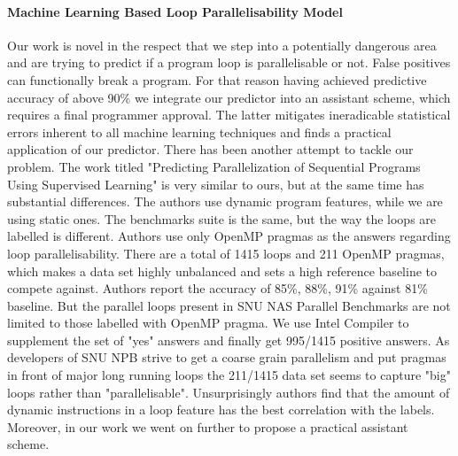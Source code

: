 \documentclass[10pt,a4paper]{report}
\begin{document}
\paragraph{Machine Learning Based Loop Parallelisability Model} Our work is novel in the respect that we step into a potentially dangerous area and are trying to predict if a program loop is parallelisable or not. False positives can functionally break a program. For that reason having achieved predictive accuracy of above 90\% we integrate our predictor into an assistant scheme, which requires a final programmer approval. The latter mitigates ineradicable statistical errors inherent to all machine learning techniques and finds a practical application of our predictor. There has been another attempt to tackle our problem. The work titled "Predicting Parallelization of Sequential Programs Using Supervised Learning" \cite{fried_ea:2013:icmla} is very similar to ours, but at the same time has substantial differences. The authors use dynamic program features, while we are using static ones. The benchmarks suite is the same, but the way the loops are labelled is different. Authors use only OpenMP pragmas as the answers regarding loop parallelisability. There are a total of 1415 loops and 211 OpenMP pragmas, which makes a data set highly unbalanced and sets a high reference baseline to compete against. Authors report the accuracy of 85\%, 88\%, 91\% against 81\% baseline. But the parallel loops present in SNU NAS Parallel Benchmarks are not limited to those labelled with OpenMP pragma. We use Intel Compiler to supplement the set of "yes" answers and finally get 995/1415 positive answers. As developers of SNU NPB strive to get a coarse grain parallelism and put pragmas in front of major long running loops the 211/1415 data set seems to capture "big" loops rather than "parallelisable". Unsurprisingly authors find that the amount of dynamic instructions in a loop feature has the best correlation with the labels. Moreover, in our work we went on further to propose a practical assistant scheme.     
\end{document}
